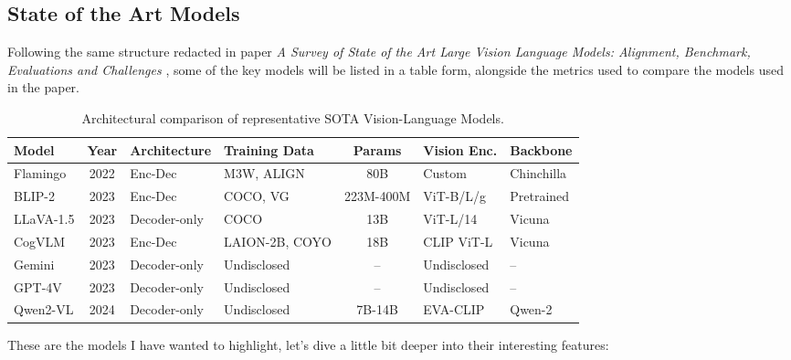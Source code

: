 \subsection{State of the Art Models}
Following the same structure redacted in paper \textit{A Survey of State of the Art Large Vision Language Models: Alignment, Benchmark, Evaluations and Challenges} \cite{li2025surveystateartlarge}, some of the key models will be listed in a table form, alongside the metrics used to compare the models used in the paper.  

\begin{table}[htbp]
	\centering
	\small
	\begin{tabularx}{\textwidth}{l c l l c l l}
		\toprule
		\textbf{Model} & \textbf{Year} & \textbf{Architecture} & \textbf{Training Data} & \textbf{Params} & \textbf{Vision Enc.} & \textbf{Backbone} \\
		\midrule
		Flamingo    & 2022 & Enc-Dec & M3W, ALIGN & 80B & Custom & Chinchilla \\
		BLIP-2      & 2023 & Enc-Dec & COCO, VG   & 223M-400M & ViT-B/L/g & Pretrained \\
		LLaVA-1.5   & 2023 & Decoder-only & COCO & 13B & ViT-L/14 & Vicuna \\
		CogVLM      & 2023 & Enc-Dec & LAION-2B, COYO & 18B & CLIP ViT-L & Vicuna \\
		Gemini      & 2023 & Decoder-only & Undisclosed & -- & Undisclosed & -- \\
		GPT-4V      & 2023 & Decoder-only & Undisclosed & -- & Undisclosed & -- \\
		Qwen2-VL    & 2024 & Decoder-only & Undisclosed & 7B-14B & EVA-CLIP & Qwen-2 \\
		\bottomrule
	\end{tabularx}
	\vspace{5pt}
	\caption{Architectural comparison of representative SOTA Vision-Language Models.}
	\label{tab:vlm_comparison_main}
\end{table}

These are the models I have wanted to highlight, let's dive a little bit deeper into their interesting features:

